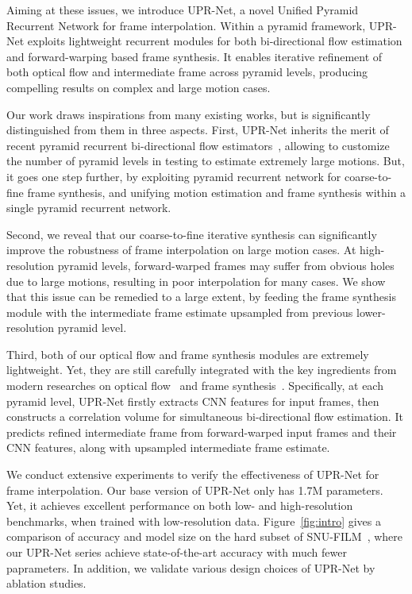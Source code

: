 \documentclass[10pt,twocolumn,letterpaper]{article}
\begin{document}
Aiming at these issues, we introduce UPR-Net, a novel Unified Pyramid Recurrent
Network for frame interpolation. Within a pyramid framework, UPR-Net exploits
lightweight recurrent modules for both bi-directional flow estimation and
forward-warping based frame synthesis. It enables iterative refinement of both
optical flow and intermediate frame across pyramid levels, producing compelling
results on complex and large motion cases.


Our work draws inspirations from many existing works, but is significantly
distinguished from them in three aspects. First, UPR-Net inherits the merit of
recent pyramid recurrent bi-directional flow
estimators~\cite{sim2021xvfi,jin2022enhanced}, allowing to customize the number
of pyramid levels in testing to estimate extremely large motions. But, it goes
one step further, by exploiting pyramid recurrent network for coarse-to-fine
frame synthesis, and unifying motion estimation and frame synthesis within a
single pyramid recurrent network.


Second, we reveal that our coarse-to-fine iterative synthesis can significantly
improve the robustness of frame interpolation on large motion cases. At
high-resolution pyramid levels, forward-warped frames may suffer from obvious
holes due to large motions, resulting in poor interpolation for many cases. We
show that this issue can be remedied to a large extent, by feeding the frame
synthesis module with the intermediate frame estimate upsampled from previous
lower-resolution pyramid level.


Third, both of our optical flow and frame synthesis modules are extremely
lightweight. Yet, they are still carefully integrated with the key ingredients
from modern researches on optical flow~\cite{sun2018pwc,teed2020raft} and frame
synthesis~\cite{niklaus2018context}. Specifically, at each pyramid level,
UPR-Net firstly extracts CNN features for input frames, then constructs a
correlation volume for simultaneous bi-directional flow estimation. It predicts
refined intermediate frame from forward-warped input frames and their CNN
features, along with upsampled intermediate frame estimate.


We conduct extensive experiments to verify the effectiveness of UPR-Net for
frame interpolation. Our base version of UPR-Net only has 1.7M parameters. Yet,
it achieves excellent performance on both low- and high-resolution
benchmarks, when trained with low-resolution data. Figure~\ref{fig:intro} gives
a comparison of accuracy and model size on the hard subset of
SNU-FILM~\cite{choi2020channel}, where our UPR-Net series achieve
state-of-the-art accuracy with much fewer paprameters. In addition, we validate
various design choices of UPR-Net by ablation studies.
\end{document}
